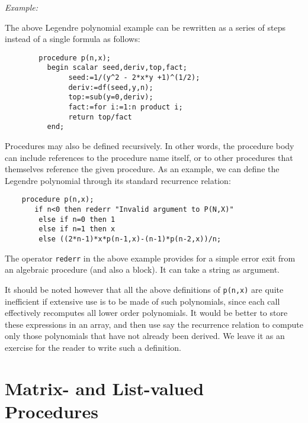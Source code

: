 \textit{Example:}

The above Legendre polynomial example can be rewritten as a series of steps
instead of a single formula as follows:
\begin{verbatim}
        procedure p(n,x);
          begin scalar seed,deriv,top,fact;
               seed:=1/(y^2 - 2*x*y +1)^(1/2);
               deriv:=df(seed,y,n);
               top:=sub(y=0,deriv);
               fact:=for i:=1:n product i;
               return top/fact
          end;
\end{verbatim}
Procedures may also be defined recursively.  In other words, the procedure
body can include references to the procedure name
itself, or to other procedures that themselves reference the given
procedure.  As an example, we can define the Legendre polynomial through
its standard recurrence relation:
\begin{verbatim}
    procedure p(n,x);
       if n<0 then rederr "Invalid argument to P(N,X)"
        else if n=0 then 1
        else if n=1 then x
        else ((2*n-1)*x*p(n-1,x)-(n-1)*p(n-2,x))/n;
\end{verbatim}

\hypertarget{operator:REDERR}{}
The operator \texttt{rederr} in the above example provides
for a simple error exit from an algebraic procedure (and also a block).
It can take a string as argument.

It should be noted however that all the above definitions of \texttt{p(n,x)} are
quite inefficient if extensive use is to be made of such polynomials, since
each call effectively recomputes all lower order polynomials. It would be
better to store these expressions in an array, and then use say the
recurrence relation to compute only those polynomials that have not already
been derived. We leave it as an exercise for the reader to write such a
definition.

\section{Matrix- and List-valued Procedures}
\hypertarget{reserved:MATRIXPROC}{}

